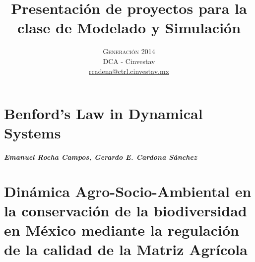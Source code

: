 



\title{\vspace{-15mm}\fontsize{24pt}{10pt}\selectfont\textbf{Presentación de proyectos para la clase de Modelado y Simulación}} %

\author{
\large \textsc{Generación 2014}\\[2mm] %
\normalsize DCA - Cinvestav \\ %
\normalsize \href{mailto:rcadena@ctrl.cinvestav.mx}{rcadena@ctrl.cinvestav.mx} %
\vspace{-5mm}
}
\date{}




    \maketitle %
    \thispagestyle{fancy} %


    \chapter{Benford's Law in Dynamical Systems}
    \paragraph{Emanuel Rocha Campos, Gerardo E. Cardona Sánchez}
    

    \chapter{Dinámica Agro-Socio-Ambiental en la conservación de la biodiversidad en México mediante la regulación de la calidad de la Matriz Agrícola}
